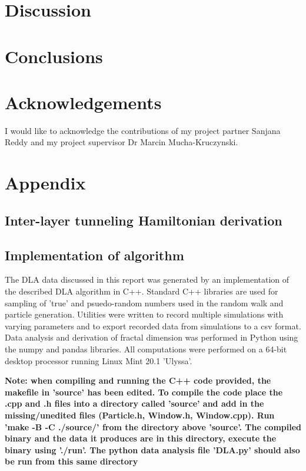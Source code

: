 \documentclass[12pt]{report} %
\begin{document}
\section*{Discussion}

\section*{Conclusions}


\section*{Acknowledgements}
I would like to acknowledge the contributions of my project partner Sanjana Reddy and my project supervisor Dr Marcin Mucha-Kruczynski.




\clearpage

\onecolumn

\section*{Appendix}

\subsection*{Inter-layer tunneling Hamiltonian derivation}

\subsection*{Implementation of algorithm}
  The DLA data discussed in this report was generated by an implementation of the described DLA algorithm in C++. Standard C++ libraries are used for sampling of 'true' and psuedo-random numbers used in the random walk and particle generation. Utilities were written to record multiple simulations with varying parameters and to export recorded data from simulations to a csv format. Data analysis and derivation of fractal dimension was performed in Python using the numpy and pandas libraries. All computations were performed on a 64-bit desktop processor running Linux Mint 20.1 'Ulyssa'.

  \textbf{Note: when compiling and running the C++ code provided, the makefile in 'source' has been edited. To compile the code place the .cpp and .h files into a directory called 'source' and add in the missing/unedited files (Particle.h, Window.h, Window.cpp). Run 'make -B -C ./source/' from the directory above 'source'. The compiled binary and the data it produces are in this directory, execute the binary using './run'. The python data analysis file 'DLA.py' should also be run from this same directory}
\end{document}
